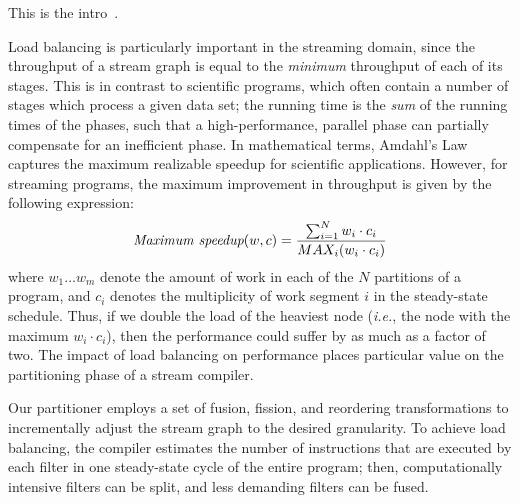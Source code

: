 This is the intro~\cite{streamit-asplos}.

Load balancing is particularly important in the streaming domain,
since the throughput of a stream graph is equal to the {\it minimum}
throughput of each of its stages.  This is in contrast to scientific
programs, which often contain a number of stages which process a given
data set; the running time is the {\it sum} of the running times of
the phases, such that a high-performance, parallel phase can partially
compensate for an inefficient phase.  In mathematical terms, Amdahl's
Law captures the maximum realizable speedup for scientific
applications.  However, for streaming programs, the maximum
improvement in throughput is given by the following expression:
\begin{align*}
\mbox{\it Maximum speedup}(w, c) = \frac{\sum_{i=1}^N{w_i \cdot c_i}}{MAX_i(w_i \cdot c_i)}
\end{align*}
where $w_1 \dots w_m$ denote the amount of work in each of the $N$
partitions of a program, and $c_i$ denotes the multiplicity of work
segment $i$ in the steady-state schedule.  Thus, if we double the load
of the heaviest node ({\it i.e.}, the node with the maximum $w_i \cdot
c_i$), then the performance could suffer by as much as a factor of
two.  The impact of load balancing on performance places particular
value on the partitioning phase of a stream compiler.

Our partitioner employs a set of fusion, fission, and reordering
transformations to incrementally adjust the stream graph to the
desired granularity.  To achieve load balancing, the compiler
estimates the number of instructions that are executed by each filter
in one steady-state cycle of the entire program; then, computationally
intensive filters can be split, and less demanding filters can be
fused.